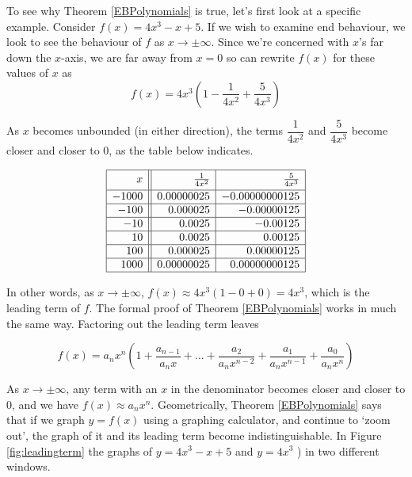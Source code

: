 \smallskip

To see why Theorem \ref{EBPolynomials} is true, let's first look at a specific example.  Consider $f(x) = 4x^3 - x + 5$.  If we wish to examine end behaviour, we look to see the behaviour of $f$ as $x \rightarrow \pm \infty$.  Since we're concerned with $x$'s far down the $x$-axis, we are far away from $x=0$ so can rewrite $f(x)$ for these values of $x$ as \[ f(x) = 4x^3 \left( 1 - \dfrac{1}{4x^2} + \dfrac{5}{4x^3}\right)\]

As $x$ becomes unbounded (in either direction), the terms $\dfrac{1}{4x^2}$ and $\dfrac{5}{4x^3}$ become closer and closer to $0$, as the table below indicates.


\[ \begin{array}{|r||r|r|}  

\hline 

 x & \frac{1}{4x^2} & \frac{5}{4x^3} \vphantom{\dfrac{a}{a}} \\ [2pt] \hline
-1000  & 0.00000025 & -0.00000000125 \\  \hline
-100  & 0.000025 & -0.00000125 \\  \hline
-10 & 0.0025 & -0.00125 \\  \hline
10  & 0.0025 & 0.00125 \\  \hline
100 & 0.000025 & 0.00000125 \\  \hline
1000 & 0.00000025 & 0.00000000125 \\  \hline
\end{array} \]

\smallskip

In other words, as $x \rightarrow \pm \infty$, $f(x) \approx 4x^3\left( 1 - 0 +0\right) = 4x^3$, which is the leading term of $f$.  The formal proof of Theorem \ref{EBPolynomials} works in much the same way.  Factoring out the leading term leaves

\[
 f(x) = a_{n} x^{n} \left( 1 + \dfrac{a_{n-1}}{a_{n} x}+ \ldots + \dfrac{a_{2}}{a_{n} x^{n-2}} + \dfrac{a_{1}}{a_{n} x^{n-1}}+\dfrac{a_{0}}{a_{n} x^{n}}\right)
\]

As $x \rightarrow \pm \infty$, any term with an $x$ in the denominator becomes closer and closer to $0$, and we have $f(x) \approx a_{n} x^{n}$.  Geometrically, Theorem \ref{EBPolynomials} says that if we graph $y=f(x)$ using a graphing calculator, and continue to `zoom out', the graph of it and its leading term become indistinguishable.  In Figure \ref{fig:leadingterm} the graphs of $y=4x^3-x+5$  and $y=4x^3$ ) in two different windows.

